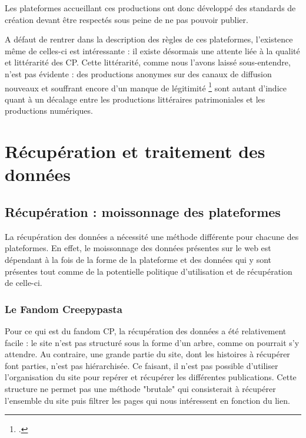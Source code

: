 \documentclass[12pt,a4paper,oneside,titlepage]{book} %
\begin{document}
	Les plateformes accueillant ces productions ont donc développé des standards de création devant être respectés sous peine de ne pas pouvoir publier. 
	
	A défaut de rentrer dans la description des règles de ces plateformes, l'existence même de celles-ci est intéressante : il existe désormais une attente liée à la qualité et littérarité des CP. Cette littérarité, comme nous l'avons laissé sous-entendre, n'est pas évidente : des productions anonymes sur des canaux de diffusion nouveaux et souffrant encore d'un manque de légitimité \footcite{saemmer_litterature_2011} sont autant d'indice quant à un décalage entre les productions littéraires patrimoniales et les productions numériques.
	
	
	

		\part{Récupération et traitement des données}
		
		\chapter{Récupération : moissonnage des plateformes}
	
	La récupération des données a nécessité une méthode différente pour chacune des plateformes.  En effet, le moissonnage des données présentes sur le web est dépendant à la fois de la forme de la plateforme et des données qui y sont présentes tout comme de la potentielle politique d'utilisation et de récupération de celle-ci. 
	
	\section{Le Fandom Creepypasta}
	Pour ce qui est du fandom CP, la récupération des données a été relativement facile : le site n'est pas structuré sous la forme d'un arbre, comme on pourrait s'y attendre. Au contraire, une grande partie du site, dont les histoires à récupérer font parties, n'est pas hiérarchisée. Ce faisant, il n'est pas possible d'utiliser l'organisation du site pour repérer et récupérer les différentes publications.
	Cette structure ne permet pas une méthode "brutale" qui consisterait à récupérer l'ensemble du site puis filtrer les pages qui nous intéressent en fonction du lien.
	
\end{document}

